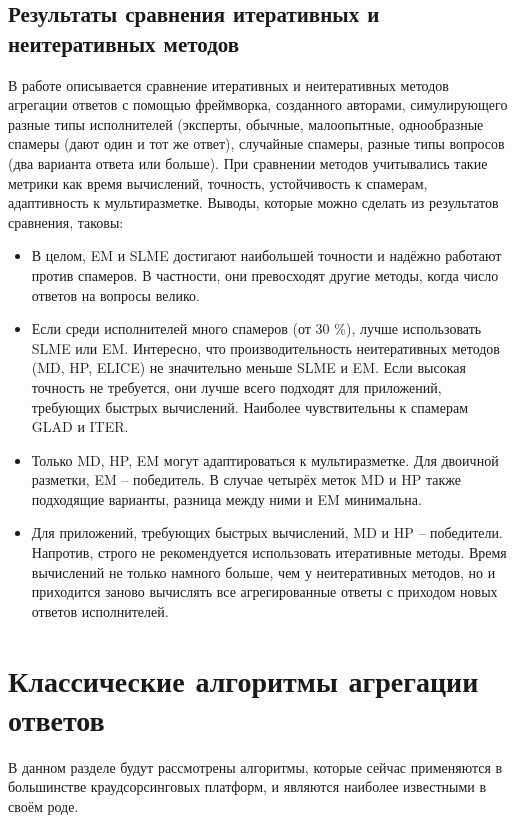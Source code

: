 \documentclass[specification,annotation,times]{itmo-student-thesis}
\begin{document}
\subsection{Результаты сравнения итеративных и неитеративных методов}
В работе \cite{hung2013evaluation} описывается сравнение итеративных и неитеративных методов агрегации ответов с помощью фреймворка, созданного авторами, симулирующего разные типы исполнителей (эксперты, обычные, малоопытные, однообразные спамеры (дают один и тот же ответ), случайные спамеры, разные типы вопросов (два варианта ответа или больше). При сравнении методов учитывались такие метрики как время вычислений, точность, устойчивость к спамерам, адаптивность к мультиразметке. Выводы, которые можно сделать из результатов сравнения, таковы:
\begin{itemize}
    \item В целом, EM и SLME достигают наибольшей точности и надёжно работают против спамеров. В частности, они превосходят другие методы, когда число ответов на вопросы велико.
    \item Если среди исполнителей много спамеров (от 30 \%), лучше использовать SLME или EM. Интересно, что производительность неитеративных методов (MD, HP, ELICE) не значительно меньше SLME и EM. Если высокая точность не требуется, они лучше всего подходят для приложений, требующих быстрых вычислений. Наиболее чувствительны к спамерам GLAD и ITER.
    \item Только MD, HP, EM могут адаптироваться к мультиразметке. Для двоичной разметки, EM – победитель. В случае четырёх меток MD и HP также подходящие варианты, разница между ними и EM минимальна.
    \item Для приложений, требующих быстрых вычислений, MD и HP – победители. Напротив, строго не рекомендуется использовать итеративные методы. Время вычислений не только намного больше, чем у неитеративных методов, но и приходится заново вычислять все агрегированные ответы с приходом новых ответов исполнителей.
\end{itemize}

\section{Классические алгоритмы агрегации ответов}
В данном разделе будут рассмотрены алгоритмы, которые сейчас применяются в большинстве краудсорсинговых платформ, и являются наиболее известными в своём роде.
\end{document}
